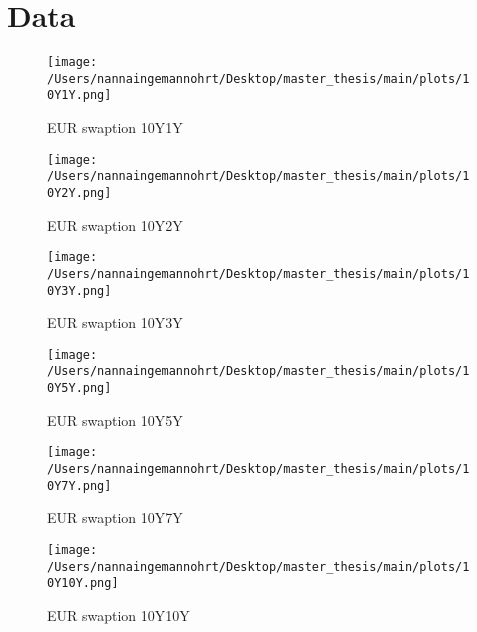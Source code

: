 \section{Data}


\begin{figure}[H]
    \centering
    \begin{minipage}{0.5\textwidth}
        \texttt{[image: /Users/nannaingemannohrt/Desktop/master\_thesis/main/plots/10Y1Y.png]}
        \caption{EUR swaption 10Y1Y}
        \label{fig:10Y1Y}
    \end{minipage}\hfill 
    \begin{minipage}{0.5\textwidth}
        \texttt{[image: /Users/nannaingemannohrt/Desktop/master\_thesis/main/plots/10Y2Y.png]}
        \caption{EUR swaption 10Y2Y}
        \label{fig:10Y2Y}
    \end{minipage}

    \centering
    \begin{minipage}{0.5\textwidth}
        \texttt{[image: /Users/nannaingemannohrt/Desktop/master\_thesis/main/plots/10Y3Y.png]}
        \caption{EUR swaption 10Y3Y}
        \label{fig:10Y3Y}
    \end{minipage}\hfill 
    \begin{minipage}{0.5\textwidth}
        \texttt{[image: /Users/nannaingemannohrt/Desktop/master\_thesis/main/plots/10Y5Y.png]}
        \caption{EUR swaption 10Y5Y}
        \label{fig:10Y5Y}
    \end{minipage}

    \centering
    \begin{minipage}{0.5\textwidth}
        \texttt{[image: /Users/nannaingemannohrt/Desktop/master\_thesis/main/plots/10Y7Y.png]}
        \caption{EUR swaption 10Y7Y}
        \label{fig:10Y7Y}
    \end{minipage}\hfill 
    \begin{minipage}{0.5\textwidth}
        \texttt{[image: /Users/nannaingemannohrt/Desktop/master\_thesis/main/plots/10Y10Y.png]}
        \caption{EUR swaption 10Y10Y}
        \label{fig:10Y10Y}
    \end{minipage}    
\end{figure}

